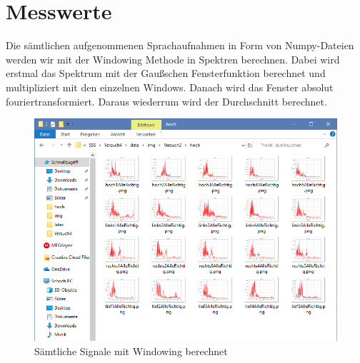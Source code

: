 \documentclass[12pt, oneside, a4paper, \docLanguage]{report}
\begin{document}
\section{Messwerte}
\label{chap:VERSUCH_2_MESSWERTE}
Die sämtlichen aufgenommenen Sprachaufnahmen in Form von Numpy-Dateien werden wir mit der Windowing Methode in Spektren berechnen.
Dabei wird erstmal das Spektrum mit der Gaußschen Fensterfunktion berechnet und multipliziert mit den einzelnen Windows.
\newline
Danach wird das Fenster absolut fouriertransformiert.
Daraus wiederrum wird der Durchschnitt berechnet. 
\begin{figure}[H]
	\centering
	\includegraphics[width=.7\linewidth]{media/folder.png}
	\caption{Sämtliche Signale mit Windowing berechnet}
	\label{img:Sämtliche Signale mit Windowing berechnet}
\end{figure}
\end{document}

